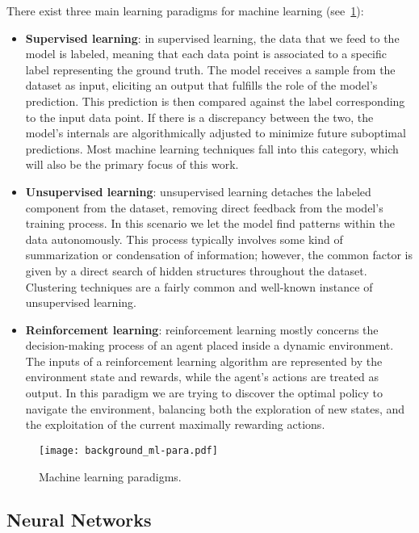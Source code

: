 There exist three main learning paradigms for machine learning (see~\cref{fig:background_ml-paradigm}):
\begin{itemize}
    \item \textbf{Supervised learning}: in supervised learning, the data that we feed to the model is labeled, meaning that each data point is associated to a specific label representing the ground truth.
The model receives a sample from the dataset as input, eliciting an output that fulfills the role of the model's prediction.
This prediction is then compared against the label corresponding to the input data point.
If there is a discrepancy between the two, the model's internals are algorithmically adjusted to minimize future suboptimal predictions.
Most machine learning techniques fall into this category, which will also be the primary focus of this work.
    \item \textbf{Unsupervised learning}: unsupervised learning detaches the labeled component from the dataset, removing direct feedback from the model's training process.
In this scenario we let the model find patterns within the data autonomously.
This process typically involves some kind of summarization or condensation of information; however, the common factor is given by a direct search of hidden structures throughout the dataset.
Clustering techniques are a fairly common and well-known instance of unsupervised learning.
    \item \textbf{Reinforcement learning}: reinforcement learning mostly concerns the decision-making process of an agent placed inside a dynamic environment.
The inputs of a reinforcement learning algorithm are represented by the environment state and rewards, while the agent's actions are treated as output.
In this paradigm we are trying to discover the optimal policy to navigate the environment, balancing both the exploration of new states, and the exploitation of the current maximally rewarding actions.
\end{itemize}

\begin{figure}[t!]
    \centering
    \texttt{[image: background\_ml-para.pdf]}
    \caption{Machine learning paradigms.}
    \label{fig:background_ml-paradigm}
\end{figure}

\subsection{Neural Networks}


